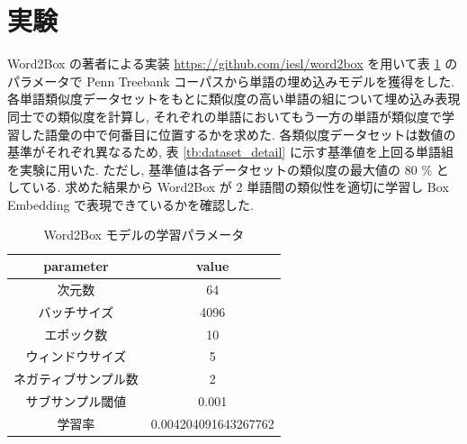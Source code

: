 \documentclass[twocolumn]{jarticle}     %
\begin{document}







\section{実験}
Word2Box の著者による実装 \url{https://github.com/iesl/word2box} を用いて表 \ref{tb:model_parameter} のパラメータで Penn Treebank コーパスから単語の埋め込みモデルを獲得をした. 
各単語類似度データセットをもとに類似度の高い単語の組について埋め込み表現同士での類似度を計算し, それぞれの単語においてもう一方の単語が類似度で学習した語彙の中で何番目に位置するかを求めた. 
各類似度データセットは数値の基準がそれぞれ異なるため, 表 \ref{tb:dataset_detail} に示す基準値を上回る単語組を実験に用いた. 
ただし, 基準値は各データセットの類似度の最大値の 80 \% としている. 
求めた結果から Word2Box が 2 単語間の類似性を適切に学習し Box Embedding で表現できているかを確認した. 

\begin{table}[th]
  \centering
  \caption{Word2Box モデルの学習パラメータ}
  \label{tb:model_parameter}
  \begin{tabular}{c|c} \hline
      parameter&value \\ \hline
      次元数&64 \\
      バッチサイズ&4096 \\ 
      エポック数&10 \\
      ウィンドウサイズ&5 \\
      ネガティブサンプル数&2 \\
      サブサンプル閾値&0.001 \\
      学習率&0.004204091643267762 \\
      \hline
  \end{tabular}
\end{table}
\end{document}
